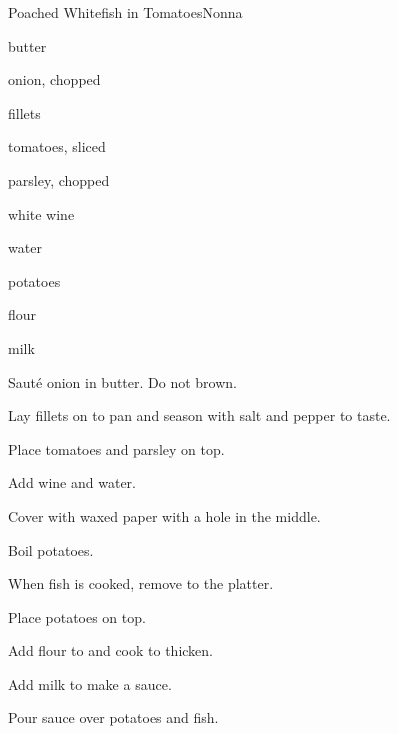 \begin{recipe}{Poached Whitefish in Tomatoes}{Nonna}{}

\begin{ingredients}
\item {} butter
\item onion, chopped
\item {} fillets
\item tomatoes, sliced
\item parsley, chopped
\item \C{\half} white wine
\item \C{\half} water
\item potatoes
\item {} flour
\item \C{\half} milk
\end{ingredients}

\begin{directions}
\item Saut\'e onion in butter. Do not brown.
\item Lay fillets on to pan and season with salt and pepper to taste.
\item Place tomatoes and parsley on top.
\item Add wine and water.
\item Cover with waxed paper with a hole in the middle.
\item Boil potatoes.
\item When fish is cooked, remove to the platter.
\item Place potatoes on top.
\item Add flour to and cook to thicken.
\item Add milk to make a sauce.
\item Pour sauce over potatoes and fish.
\end{directions}

\end{recipe}
